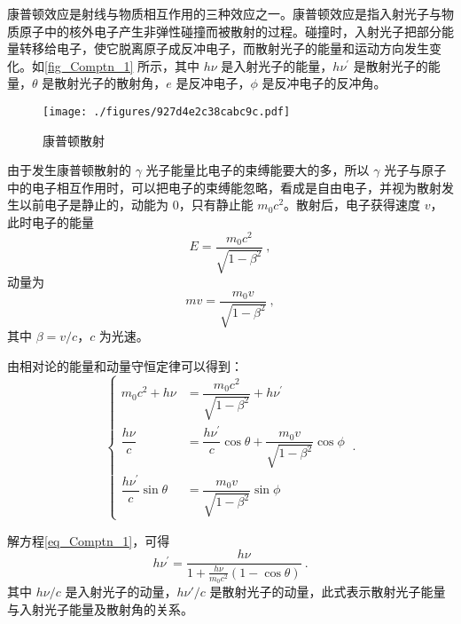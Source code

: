 
\begin{issues}
\issueMissDepend
\end{issues}

康普顿效应是射线与物质相互作用的三种效应之一。康普顿效应是指入射光子与物质原子中的核外电子产生非弹性碰撞而被散射的过程。碰撞时，入射光子把部分能量转移给电子，使它脱离原子成反冲电子，而散射光子的能量和运动方向发生变化。如\autoref{fig_Comptn_1} 所示，其中 $h\nu$ 是入射光子的能量，$h\nu^\prime$ 是散射光子的能量，$\theta$ 是散射光子的散射角，$e$ 是反冲电子，$\phi$ 是反冲电子的反冲角。
\begin{figure}[ht]
\centering
\texttt{[image: ./figures/927d4e2c38cabc9c.pdf]}
\caption{康普顿散射} \label{fig_Comptn_1}
\end{figure}
由于发生康普顿散射的 $\gamma$ 光子能量比电子的束缚能要大的多，所以 $\gamma$ 光子与原子中的电子相互作用时，可以把电子的束缚能忽略，看成是自由电子，并视为散射发生以前电子是静止的，动能为 $0$，只有静止能 $m_0c^2$。散射后，电子获得速度 $v$，此时电子的能量
\begin{equation}
E=\frac{m_{0} c^{2}}{\sqrt{1-\beta^{2}}}~,
\end{equation}
动量为
\begin{equation}
m v=\frac{m_{0} v}{\sqrt{1-\beta^{2}}}~,
\end{equation}
其中 $\beta=v/c$，$c$ 为光速。

由相对论的能量和动量守恒定律可以得到：
\begin{equation} \label{eq_Comptn_1}
\begin{cases}
m_{0} c^{2}+h \nu&=\dfrac{m_{0} c^{2}}{\sqrt{1-\beta^{2}}}+h \nu^{\prime} \\
\dfrac{h \nu}{c}&=\dfrac{h \nu^{\prime}}{c} \cos \theta+\dfrac{m_{0} v}{\sqrt{1-\beta^{2}}} \cos \phi \\
\dfrac{h \nu^{\prime}}{c} \sin \theta&=\dfrac{m_{0} v}{\sqrt{1-\beta^{2}}} \sin \phi
\end{cases}~.
\end{equation}

解方程\autoref{eq_Comptn_1}，可得
\begin{equation}
h \nu^{\prime}=\frac{h \nu}{1+\frac{h \nu}{m_{0} c^{2}}(1-\cos \theta)}~.
\end{equation}
其中 $h\nu / c$ 是入射光子的动量，$h\nu' / c$ 是散射光子的动量，此式表示散射光子能量与入射光子能量及散射角的关系。